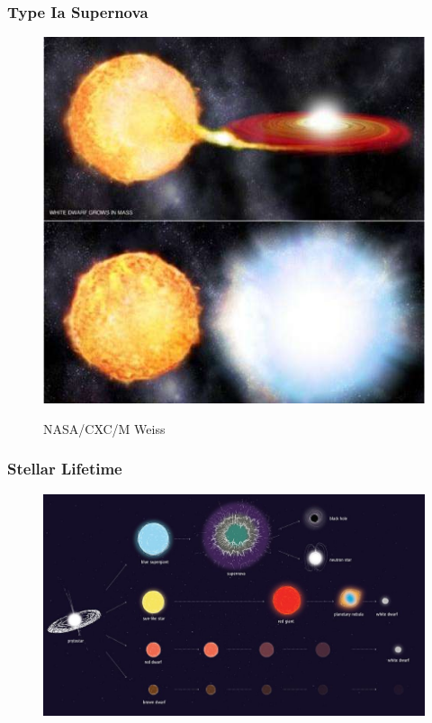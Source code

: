 \documentclass{beamer}
\begin{document}
\begin{frame}
\frametitle{Type Ia Supernova}

        \begin{figure}
    \begin{center}
      \includegraphics[width=.60\linewidth]{binary.jpg}
    \end{center}
		\begin{center}
			NASA/CXC/M Weiss
		\end{center}
  \end{figure}


\end{frame}




\begin{frame}
\frametitle{Stellar Lifetime}

        \begin{figure}
    \begin{center}
      \includegraphics[width=.90\linewidth]{SE.jpg}
    \end{center}
  \end{figure}


\end{frame}
\end{document}
